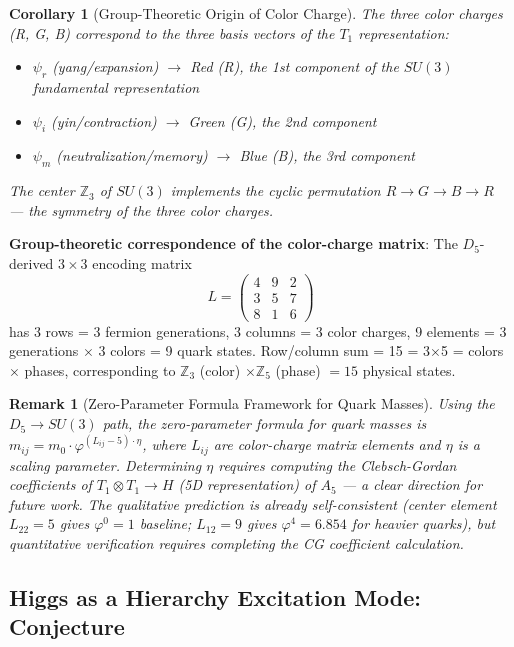 \documentclass[12pt,a4paper,twocolumn]{article}
\renewcommand{\phi}{\varphi}
\newtheorem{corollary}[theorem]{Corollary}
\newtheorem{remark}[theorem]{Remark}
\begin{document}
\begin{corollary}[Group-Theoretic Origin of Color Charge]
\label{cor:color_origin}
The three color charges (R, G, B) correspond to the three basis vectors of the $T_1$ representation:
\begin{itemize}
\item $\psi_r$ (yang/expansion) $\to$ Red (R), the 1st component of the $SU(3)$ fundamental representation
\item $\psi_i$ (yin/contraction) $\to$ Green (G), the 2nd component
\item $\psi_m$ (neutralization/memory) $\to$ Blue (B), the 3rd component
\end{itemize}
The center $\mathbb{Z}_3$ of $SU(3)$ implements the cyclic permutation $R \to G \to B \to R$ --- the symmetry of the three color charges.
\end{corollary}

\textbf{Group-theoretic correspondence of the color-charge matrix}: The $D_5$-derived $3\times3$ encoding matrix
\[
L = \begin{pmatrix} 4 & 9 & 2 \\ 3 & 5 & 7 \\ 8 & 1 & 6 \end{pmatrix}
\]
has 3 rows = 3 fermion generations, 3 columns = 3 color charges, 9 elements = 3 generations $\times$ 3 colors = 9 quark states. Row/column sum = 15 = 3$\times$5 = colors $\times$ phases, corresponding to $\mathbb{Z}_3$ (color) $\times \mathbb{Z}_5$ (phase) $= 15$ physical states.

\begin{remark}[Zero-Parameter Formula Framework for Quark Masses]
\label{rmk:quark_mass_framework}
Using the $D_5 \to SU(3)$ path, the zero-parameter formula for quark masses is $m_{ij} = m_0 \cdot \phi^{(L_{ij} - 5)\cdot\eta}$, where $L_{ij}$ are color-charge matrix elements and $\eta$ is a scaling parameter. Determining $\eta$ requires computing the Clebsch-Gordan coefficients of $T_1 \otimes T_1 \to H$ (5D representation) of $A_5$ --- a clear direction for future work. The qualitative prediction is already self-consistent (center element $L_{22}=5$ gives $\phi^0=1$ baseline; $L_{12}=9$ gives $\phi^4=6.854$ for heavier quarks), but quantitative verification requires completing the CG coefficient calculation.
\end{remark}

\subsection{Higgs as a Hierarchy Excitation Mode: Conjecture}
\label{subsec:higgs_excitation}
\end{document}
